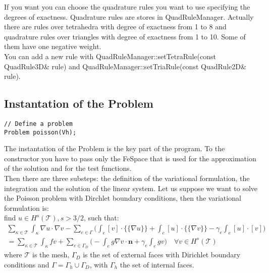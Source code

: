 \documentclass[12pt, a4paper]{article}
\newcommand{\code}[1]{{\footnotesize\ttfamily #1}}
\theoremstyle{definition}
\begin{document}
If you want you can choose the quadrature rules you want to use specifying the
degrees of exactness. Quadrature rules are stores in \code{QuadRuleManager}. 
Actually there are rules over tetrahedra with degree of exactness from 1 to 8 
and quadrature rules over triangles with degree of exactness from 1 to 10. Some 
of them have one negative weight.\\
You can add a new rule with \code{QuadRuleManager::setTetraRule(const 
QuadRule3D\& rule)} and \code{QuadRuleManager::setTriaRule(const QuadRule2D\& 
rule)}.

\subsection{Instantation of the Problem}
\begin{lstlisting}
// Define a problem
Problem poisson(Vh);
\end{lstlisting}

The instantation of the Problem is the key part of the program.
To the constructor you have to pass only the FeSpace that is used for the
approximation of the solution and for the test functions.\\
Then there are three substeps: the definition of the variational formulation,
the integration and the solution of the linear system. Let us suppose we
want to solve the Poisson problem with Dirchlet boundary conditions, then the 
variational formulation is:\\
find $ u \in H^s(\mathcal{T}), s>3/2 $, such that:
\begin{multline*}
			\sum_{\kappa \in \mathcal{T}} \int_\kappa \nabla u \cdot \nabla v
			-\sum_{e \in \Gamma} \bigg( \int_e [v] \cdot \{\!\!\{ \nabla u \}\!\!\}
			+ \int_e [u] \cdot \{\!\!\{ \nabla v \}\!\!\}
			- \gamma_e \int_e [u] \cdot [v] \bigg)\\
			= \sum_{\kappa \in \mathcal{T}} \int_\kappa fv
			+ \sum_{e \in \Gamma_D} \bigg( - \int_e g \nabla v \cdot \mathbf{n}
			+ \gamma_e \int_e gv \bigg) \quad \forall v \in H^s(\mathcal{T})
\end{multline*}
where $ \mathcal{T} $ is the mesh, $ \Gamma_D $ is the set of
external faces with Dirichlet boundary conditions and $ \Gamma = \Gamma_h
\cup \Gamma_D $, with $ \Gamma_h $ the set of internal faces.\\
\end{document}
